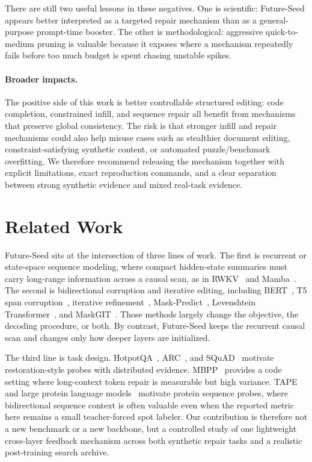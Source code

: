 \documentclass{article}
\begin{document}
There are still two useful lessons in these negatives. One is scientific: Future-Seed appears better interpreted as a targeted repair mechanism than as a general-purpose prompt-time booster. The other is methodological: aggressive quick-to-medium pruning is valuable because it exposes where a mechanism repeatedly fails before too much budget is spent chasing unstable spikes.

\paragraph{Broader impacts.}
The positive side of this work is better controllable structured editing: code completion, constrained infill, and sequence repair all benefit from mechanisms that preserve global consistency. The risk is that stronger infill and repair mechanisms could also help misuse cases such as stealthier document editing, constraint-satisfying synthetic content, or automated puzzle/benchmark overfitting. We therefore recommend releasing the mechanism together with explicit limitations, exact reproduction commands, and a clear separation between strong synthetic evidence and mixed real-task evidence.

\section{Related Work}
Future-Seed sits at the intersection of three lines of work. The first is recurrent or state-space sequence modeling, where compact hidden-state summaries must carry long-range information across a causal scan, as in RWKV~\citep{peng2023rwkv} and Mamba~\citep{gu2024mamba}. The second is bidirectional corruption and iterative editing, including BERT~\citep{devlin2019bert}, T5 span corruption~\citep{raffel2020t5}, iterative refinement~\citep{lee2018iterative}, Mask-Predict~\citep{ghazvininejad2019maskpredict}, Levenshtein Transformer~\citep{gu2019levenshtein}, and MaskGIT~\citep{chang2022maskgit}. Those methods largely change the objective, the decoding procedure, or both. By contrast, Future-Seed keeps the recurrent causal scan and changes only how deeper layers are initialized.

The third line is task design. HotpotQA~\citep{yang2018hotpotqa}, ARC~\citep{clark2018arc}, and SQuAD~\citep{rajpurkar2016squad} motivate restoration-style probes with distributed evidence. MBPP~\citep{austin2021program} provides a code setting where long-context token repair is measurable but high variance. TAPE~\citep{rao2019tape} and large protein language models~\citep{rives2021biological} motivate protein sequence probes, where bidirectional sequence context is often valuable even when the reported metric here remains a small teacher-forced spot labeler. Our contribution is therefore not a new benchmark or a new backbone, but a controlled study of one lightweight cross-layer feedback mechanism across both synthetic repair tasks and a realistic post-training search archive.
\end{document}
